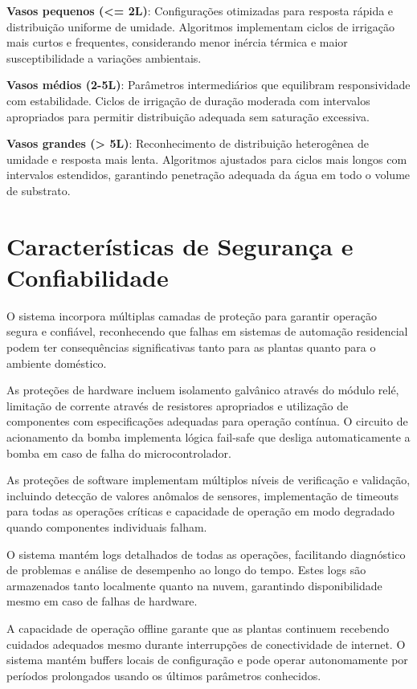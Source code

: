 \textbf{Vasos pequenos (<= 2L)}: Configurações otimizadas para resposta rápida e distribuição uniforme de umidade. Algoritmos implementam ciclos de irrigação mais curtos e frequentes, considerando menor inércia térmica e maior susceptibilidade a variações ambientais.

\textbf{Vasos médios (2-5L)}: Parâmetros intermediários que equilibram responsividade com estabilidade. Ciclos de irrigação de duração moderada com intervalos apropriados para permitir distribuição adequada sem saturação excessiva.

\textbf{Vasos grandes (> 5L)}: Reconhecimento de distribuição heterogênea de umidade e resposta mais lenta. Algoritmos ajustados para ciclos mais longos com intervalos estendidos, garantindo penetração adequada da água em todo o volume de substrato.

\section{Características de Segurança e Confiabilidade}

O sistema incorpora múltiplas camadas de proteção para garantir operação segura e confiável, reconhecendo que falhas em sistemas de automação residencial podem ter consequências significativas tanto para as plantas quanto para o ambiente doméstico.

As proteções de hardware incluem isolamento galvânico através do módulo relé, limitação de corrente através de resistores apropriados e utilização de componentes com especificações adequadas para operação contínua. O circuito de acionamento da bomba implementa lógica fail-safe que desliga automaticamente a bomba em caso de falha do microcontrolador.

As proteções de software implementam múltiplos níveis de verificação e validação, incluindo detecção de valores anômalos de sensores, implementação de timeouts para todas as operações críticas e capacidade de operação em modo degradado quando componentes individuais falham.

O sistema mantém logs detalhados de todas as operações, facilitando diagnóstico de problemas e análise de desempenho ao longo do tempo. Estes logs são armazenados tanto localmente quanto na nuvem, garantindo disponibilidade mesmo em caso de falhas de hardware.

A capacidade de operação offline garante que as plantas continuem recebendo cuidados adequados mesmo durante interrupções de conectividade de internet. O sistema mantém buffers locais de configuração e pode operar autonomamente por períodos prolongados usando os últimos parâmetros conhecidos.

